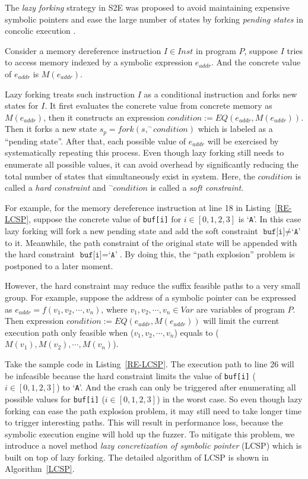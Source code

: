 The \textit{lazy forking} strategy in S2E was proposed to avoid 
maintaining expensive symbolic pointers and ease the large number 
of states by forking \textit{pending states} in concolic 
execution \cite{chipounov2011s2e}. 

Consider a memory dereference instruction $I\in Inst$ in program $P$, 
suppose $I$ tries to access memory indexed by a symbolic expression 
$e_{addr}$. And the concrete value of $e_{addr}$ is $M(e_{addr})$.

Lazy forking treats such instruction $I$ as a conditional instruction 
and forks new states for $I$. It first evaluates the concrete value 
from concrete memory as $M(e_{addr})$, then it constructs an 
expression $condition:= EQ(e_{addr}, M(e_{addr}))$. Then it forks a 
new state $s_p=fork(s, ^\neg condition)$ which is labeled as a 
``pending state''. After that, each possible value of $e_{addr}$ 
will be exercised by systematically repeating this process. Even 
though lazy forking still needs to enumerate all possible values, 
it can avoid overhead by significantly reducing the total number 
of states that simultaneously exist in system. Here, 
the $condition$ is called a \textit{hard constraint} and 
$^\neg condition$ is called a \textit{soft constraint}.

For example, for the memory dereference instruction at line 18 
in Listing~\ref{RE-LCSP}, suppose the concrete value of 
\texttt{buf[i]} for $i\in[0,1,2,3]$ is `\texttt{A}'. 
In this case lazy forking will fork a new pending state and 
add the soft constraint $\texttt{buf[i]}\neq\texttt{`A'}$ to 
it. Meanwhile, the path constraint of the original state will 
be appended with the hard constraint $\texttt{buf[i]}=\texttt{`A'}$.
By doing this, the ``path explosion'' problem is postponed to a later moment.

However, the hard constraint may reduce the suffix feasible paths 
to a very small group. For example, suppose the address of a symbolic 
pointer can be expressed as $e_{addr}=f(v_1, v_2,\cdots, v_n)$, 
where $v_1, v_2,\cdots, v_n\in Var$ are variables of program $P$. 
Then expression $condition:= EQ(e_{addr}, M(e_{addr}))$ will limit 
the current execution path only feasible when ($v_1, v_2,\cdots, v_n$) 
equals to ($M(v_1), M(v_2),\cdots, M(v_n)$). 

Take the sample code in Listing~\ref{RE-LCSP}. The execution path 
to line 26 will be infeasible because the hard constraint limits 
the value of \texttt{buf[i]} ($i\in[0,1,2,3]$) to `\texttt{A}'. 
And the crash can only be triggered after enumerating all possible 
values for \texttt{buf[i]} ($i\in[0,1,2,3]$) in the worst case.
So even though lazy forking can ease the path explosion problem, 
it may still need to take longer time to trigger interesting paths. 
This will result in performance loss, because the symbolic 
execution engine will hold up the fuzzer. 
To mitigate this problem, we introduce a novel method 
\emph{lazy concretization of symbolic pointer} (LCSP) 
which is built on top of lazy forking. The detailed algorithm 
of LCSP is shown in Algorithm~\ref{LCSP}.


